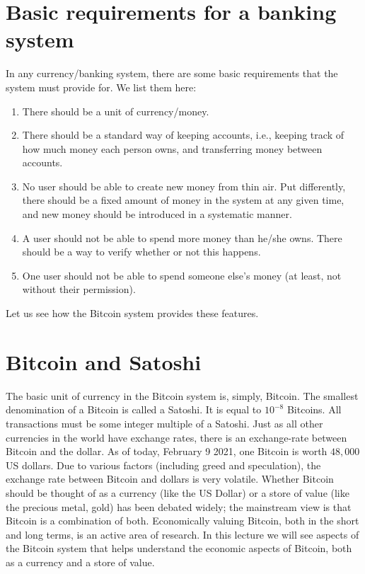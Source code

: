 \documentclass{article}
\begin{document}


\section*{Basic requirements for a banking system} 
In any currency/banking system, there are some basic requirements that the system must provide for. We list them here:
\begin{enumerate}
    \item There should be a unit of currency/money.
    \item There should be a standard way of keeping accounts, i.e., keeping track of how much money each person owns, and transferring money between accounts. 
    \item No user should be able to create new money from thin air. Put differently, there should be a fixed amount of money in the system at any given time, and new money should be introduced in a systematic manner.
    \item A user should not be able to spend more money than he/she owns. There should be a way to verify whether or not this happens.
    \item One user should not be able to spend someone else's money (at least, not without their permission).
\end{enumerate}
Let us see how the Bitcoin system provides these features.

\section*{Bitcoin and Satoshi}
The basic unit of currency in the Bitcoin system is, simply, Bitcoin. The smallest denomination of a Bitcoin is called a Satoshi. It is equal to $10^{-8}$ Bitcoins. All transactions must be some integer multiple of a Satoshi. Just as all other currencies in the world have exchange rates, there is an exchange-rate between Bitcoin and the dollar. As of today, February 9 2021, one Bitcoin is worth $48,000$ US dollars. Due to various factors (including greed and speculation), the exchange rate between Bitcoin and dollars is very volatile. Whether Bitcoin should be thought of as a currency (like the US Dollar) or a store of value (like the precious metal, gold) has been debated widely; the mainstream view is that Bitcoin is a combination of both. Economically valuing Bitcoin, both in the short and long terms, is an active area of research. In this lecture we will see aspects of the Bitcoin system that helps understand the economic aspects of Bitcoin, both as a currency and a store of value. 
\end{document}
